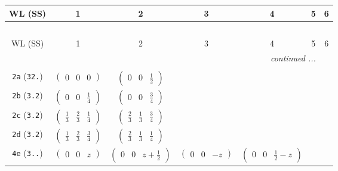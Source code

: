 \documentclass[fleqn,9pt,landscape]{jsarticle}
\begin{document}
\begin{center}
\renewcommand{\arraystretch}{1.2}
\begin{longtable}{ccccccc}
 \hline \hline
WL (SS) & 1 & 2 & 3 & 4 & 5 & 6 \\ \hline \endfirsthead

\multicolumn{6}{l}{\tablename\ \thetable{}} \\
 \hline \hline
WL (SS) & 1 & 2 & 3 & 4 & 5 & 6 \\ \hline \endhead

 \hline \hline
\multicolumn{6}{r}{\footnotesize\it continued ...} \\ \endfoot

 \hline \hline
\multicolumn{6}{r}{} \\ \endlastfoot

{\tt 2a} ({\tt 32.}) & $ \begin{pmatrix} 0 & 0 & 0 \end{pmatrix} $ & $ \begin{pmatrix} 0 & 0 & \frac{1}{2} \end{pmatrix} $ & $  $ & $  $ & $  $ & $  $ \\ \hline
{\tt 2b} ({\tt 3.2}) & $ \begin{pmatrix} 0 & 0 & \frac{1}{4} \end{pmatrix} $ & $ \begin{pmatrix} 0 & 0 & \frac{3}{4} \end{pmatrix} $ & $  $ & $  $ & $  $ & $  $ \\ \hline
{\tt 2c} ({\tt 3.2}) & $ \begin{pmatrix} \frac{1}{3} & \frac{2}{3} & \frac{1}{4} \end{pmatrix} $ & $ \begin{pmatrix} \frac{2}{3} & \frac{1}{3} & \frac{3}{4} \end{pmatrix} $ & $  $ & $  $ & $  $ & $  $ \\ \hline
{\tt 2d} ({\tt 3.2}) & $ \begin{pmatrix} \frac{1}{3} & \frac{2}{3} & \frac{3}{4} \end{pmatrix} $ & $ \begin{pmatrix} \frac{2}{3} & \frac{1}{3} & \frac{1}{4} \end{pmatrix} $ & $  $ & $  $ & $  $ & $  $ \\ \hline
{\tt 4e} ({\tt 3..}) & $ \begin{pmatrix} 0 & 0 & z \end{pmatrix} $ & $ \begin{pmatrix} 0 & 0 & z + \frac{1}{2} \end{pmatrix} $ & $ \begin{pmatrix} 0 & 0 & - z \end{pmatrix} $ & $ \begin{pmatrix} 0 & 0 & \frac{1}{2} - z \end{pmatrix} $ & $  $ & $  $ \\ \hline

\end{longtable}
\end{center}
\end{document}
